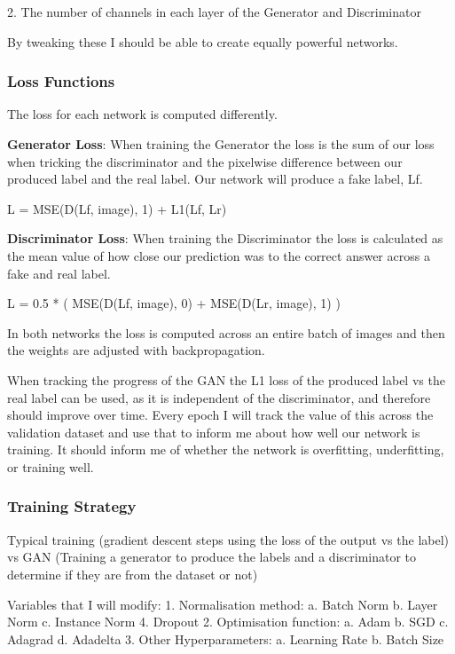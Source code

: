 \documentclass{UoYCSproject}
\begin{document}
2. The number of channels in each layer of the Generator and Discriminator

By tweaking these I should be able to create equally powerful networks. 

\subsubsection{Loss Functions}

The loss for each network is computed differently.

\textbf{Generator Loss}: When training the Generator the loss is the sum of our loss when tricking the discriminator and the pixelwise difference between our produced label and the real label. Our network will produce a fake label, Lf. 

L = MSE(D(Lf, image), 1) + L1(Lf, Lr) 

\textbf{Discriminator Loss}: When training the Discriminator the loss is calculated as the mean value of how close our prediction was to the correct answer across a fake and real label.

L = 0.5 * ( MSE(D(Lf, image), 0) + MSE(D(Lr, image), 1) ) 

In both networks the loss is computed across an entire batch of images and then the weights are adjusted with backpropagation.

When tracking the progress of the GAN the L1 loss of the produced label vs the real label can be used, as it is independent of the discriminator, and therefore should improve over time. Every epoch I will track the value of this across the validation dataset and use that to inform me about how well our network is training. It should inform me of whether the network is overfitting, underfitting, or training well. 

\subsubsection{Training Strategy}

Typical training (gradient descent steps using the loss of the output vs the label) vs GAN (Training a generator to produce the labels and a discriminator to determine if they are from the dataset or not)

Variables that I will modify:
1. Normalisation method:
a. Batch Norm
b. Layer Norm
c. Instance Norm
4. Dropout
2. Optimisation function:
a. Adam
b. SGD
c. Adagrad
d. Adadelta
3. Other Hyperparameters:
a. Learning Rate
b. Batch Size
\end{document}
